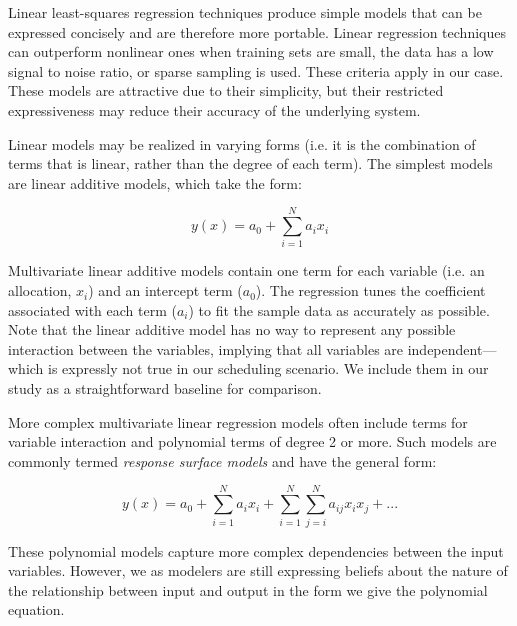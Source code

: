 Linear least-squares regression techniques produce simple models that can be expressed concisely and are therefore more portable. Linear regression techniques can outperform nonlinear ones when training sets are small, the data has a low signal to noise ratio, or sparse sampling is used\cite{hastie}. These criteria apply in our case. These models are attractive due to their simplicity, but their restricted expressiveness may reduce their accuracy of the underlying system.

Linear models may be realized in varying forms (i.e. it is the combination of terms that is linear, rather than the degree of each term).  The simplest models are linear additive models, which take the form:

\begin {equation}
y(x) = a_0 + \sum_{i=1}^{N}{a_ix_i}
\end {equation}

Multivariate linear additive models contain one term for each variable (i.e. an allocation, $x_i$) and an intercept term ($a_0$).  The regression tunes the coefficient associated with each term ($a_i$) to fit the sample data as accurately as possible.  Note that the linear additive model has no way to represent any possible interaction between the variables, implying that all variables are independent---which is expressly not true in our scheduling scenario.  We include them in our study as a straightforward baseline for comparison.

More complex multivariate linear regression models often include terms for variable interaction and polynomial terms of degree 2 or more.  Such models are commonly termed {\em response surface models} and have the general form:

\begin {equation}
y(x) = a_0 + \sum_{i=1}^{N}{a_ix_i} + \sum_{i = 1}^{N}\sum_{j=i}^{N}{a_{ij}x_ix_j} + ...
\end {equation}

These polynomial models capture more complex dependencies between the input variables.  However, we as modelers are still expressing beliefs about the nature of the relationship between input and output in the form we give the polynomial equation.

